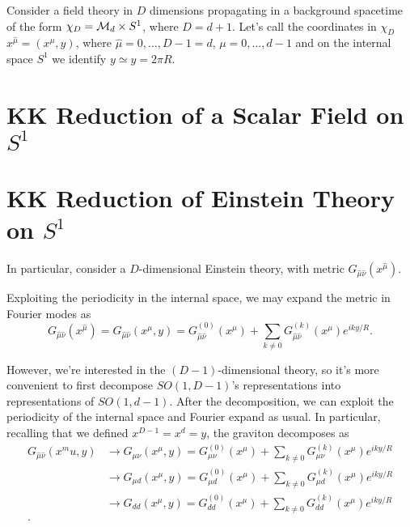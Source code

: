 Consider a field theory in $D$ dimensions propagating in a background spacetime of the form $\chi_D = \mathcal{M}_d \times S^1$, where $D = d+1$. Let's call the coordinates in $\chi_D$ $x^{\hat{\mu}} = (x^\mu, y)$, where $\hat{\mu} = 0, \dots, D-1 = d$, $\mu = 0, \dots, d-1$ and on the internal space $S^1$ we identify $y \simeq y = 2\pi R$.

\section{KK Reduction of a Scalar Field on \texorpdfstring{$S^1$}{S1}}

\section{KK Reduction of Einstein Theory on \texorpdfstring{$S^1$}{S1}}
In particular, consider a $D$-dimensional Einstein theory, with metric $G_{\hat{\mu} \hat{\nu}} (x^{\hat{\mu}})$.

Exploiting the periodicity in the internal space, we may expand the metric in Fourier modes as
\begin{equation}
    G_{\hat{\mu} \hat{\nu}} (x^{\hat{\mu}}) = G_{\hat{\mu} \hat{\nu}} (x^\mu, y) = G^{(0)}_{\hat{\mu} \hat{\nu}} (x^\mu)+ \sum_{k \neq 0} G^{(k)}_{\hat{\mu} \hat{\nu}} (x^\mu) e^{ik y / R}.
\end{equation}

However, we're interested in the $(D-1)$-dimensional theory, so it's more convenient to first decompose $SO(1,D-1)$'s representations into representations of $SO(1,d-1)$. After the decomposition, we can exploit the periodicity of the internal space and Fourier expand as usual. In particular, recalling that we defined $x^{D-1} = x^d = y$, the graviton decomposes as
\begin{align}
    G_{\hat{\mu}\hat{\nu}} (x^mu, y) 
    &\to G_{\mu\nu}(x^\mu, y) = G^{(0)}_{{\mu} {\nu}} (x^\mu)+ \sum_{k \neq 0} G^{(k)}_{{\mu} {\nu}} (x^\mu) e^{ik y / R} \\
    &\to G_{\mu d} (x^\mu, y) = G^{(0)}_{{\mu} {d}} (x^\mu)+ \sum_{k \neq 0} G^{(k)}_{{\mu} {d}} (x^\mu) e^{ik y / R} \\
    &\to G_{dd} (x^\mu, y) = G^{(0)}_{{d} {d}} (x^\mu)+ \sum_{k \neq 0} G^{(k)}_{{d} {d}} (x^\mu) e^{ik y / R} \\.
\end{align}

